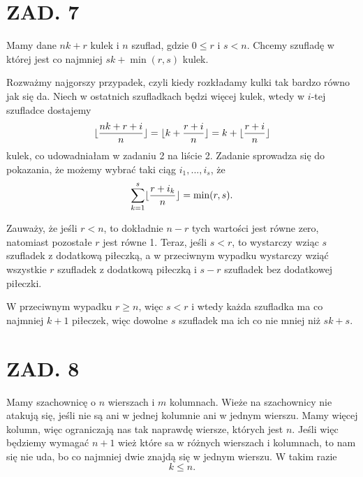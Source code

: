 \documentclass{article}[13pt]
\begin{document}
\section*{ZAD. 7}

Mamy dane $nk+r$ kulek i $n$ szuflad, gdzie $0\leq r$ i $s<n$. Chcemy szufladę w której jest co najmniej $sk+\min(r,s)$ kulek.
\smallskip

Rozważmy najgorszy przypadek, czyli kiedy rozkładamy kulki tak bardzo równo jak się da. Niech w ostatnich szufladkach będzi więcej kulek, wtedy w $i$-tej szufladce dostajemy
$$\lfloor{nk+r+i\over n}\rfloor=\lfloor k+{r+i\over n}\rfloor=k+\lfloor{r+i\over n}\rfloor$$
kulek, co udowadniałam w zadaniu 2 na liście 2. Zadanie sprowadza się do pokazania, że możemy wybrać taki ciąg $i_1,...,i_s$, że
$$\sum\limits_{k=1}^s\lfloor{r+i_k\over n}\rfloor=\min(r,s).$$

Zauważy, że jeśli $r<n$, to dokładnie $n-r$ tych wartości jest równe zero, natomiast pozostałe $r$ jest równe 1. Teraz, jeśli $s<r$, to wystarczy wziąc $s$ szufladek z dodatkową piłeczką, a w przeciwnym wypadku wystarczy wziąć wszystkie $r$ szufladek z dodatkową piłeczką i $s-r$ szufladek bez dodatkowej piłeczki. 

W przeciwnym wypadku $r\geq n$, więc $s<r$ i wtedy każda szufladka ma co najmniej $k+1$ piłeczek, więc dowolne $s$ szufladek ma ich co nie mniej niż $sk+s$.

\section*{ZAD. 8}

Mamy szachownicę o $n$ wierszach i $m$ kolumnach. Wieże na szachownicy nie atakują się, jeśli nie są ani w jednej kolumnie ani w jednym wierszu. Mamy więcej kolumn, więc ograniczają nas tak naprawdę wiersze, których jest $n$. Jeśli więc będziemy wymagać $n+1$ wież które sa w różnych wierszach i kolumnach, to nam się nie uda, bo co najmniej dwie znajdą się w jednym wierszu. W takim razie 
$$k\leq n.$$
\end{document}
